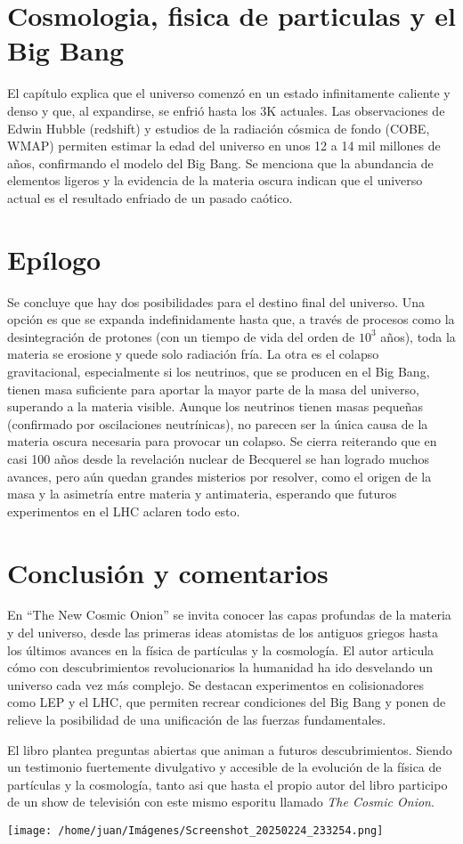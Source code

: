 \documentclass[12pt]{article}
\begin{document}
\section{Cosmologia, fisica de particulas y el Big Bang}
El capítulo explica que el universo comenzó en un estado infinitamente caliente y denso y que, al expandirse, se enfrió hasta los 3K actuales. Las observaciones de Edwin Hubble (redshift) y estudios de la radiación cósmica de fondo (COBE, WMAP) permiten estimar la edad del universo en unos 12 a 14 mil millones de años, confirmando el modelo del Big Bang. Se menciona que la abundancia de elementos ligeros y la evidencia de la materia oscura indican que el universo actual es el resultado enfriado de un pasado caótico.

\section{Epílogo}
Se concluye que hay dos posibilidades para el destino final del universo. Una opción es que se expanda indefinidamente hasta que, a través de procesos como la desintegración de protones (con un tiempo de vida del orden de $10^{3}$ años), toda la materia se erosione y quede solo radiación fría. La otra es el colapso gravitacional, especialmente si los neutrinos, que se producen en el Big Bang, tienen masa suficiente para aportar la mayor parte de la masa del universo, superando a la materia visible. Aunque los neutrinos tienen masas pequeñas (confirmado por oscilaciones neutrínicas), no parecen ser la única causa de la materia oscura necesaria para provocar un colapso. Se cierra reiterando que en casi 100 años desde la revelación nuclear de Becquerel se han logrado muchos avances, pero aún quedan grandes misterios por resolver, como el origen de la masa y la asimetría entre materia y antimateria, esperando que futuros experimentos en el LHC aclaren todo esto.

\section{Conclusión y comentarios}
En “The New Cosmic Onion” se invita conocer las capas profundas de la materia y del universo, desde las primeras ideas atomistas de los antiguos griegos hasta los últimos avances en la física de partículas y la cosmología. El autor articula cómo con descubrimientos revolucionarios la humanidad ha ido desvelando un universo cada vez más complejo. Se destacan experimentos en colisionadores como LEP y el LHC, que permiten recrear condiciones del Big Bang y ponen de relieve la posibilidad de una unificación de las fuerzas fundamentales.


El libro plantea preguntas abiertas que animan a futuros descubrimientos. Siendo un testimonio fuertemente divulgativo y accesible de la evolución de la física de partículas y la cosmología, tanto asi que hasta el propio autor del libro participo de un show de televisión con este mismo esporitu llamado \textit{The Cosmic Onion}.

\begin{center}
    \texttt{[image: /home/juan/Imágenes/Screenshot\_20250224\_233254.png]}
\end{center}
\end{document}
